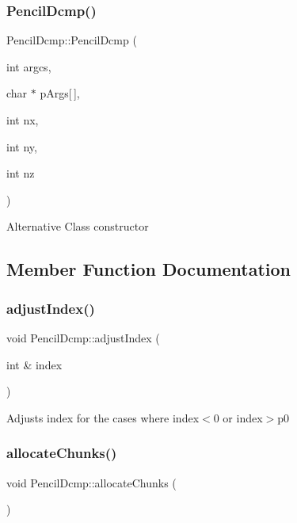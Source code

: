 \subsubsection{\texorpdfstring{Pencil\+Dcmp()}{PencilDcmp()}\hspace{0.1cm}{\footnotesize\ttfamily [2/2]}}
{\footnotesize\ttfamily Pencil\+Dcmp\+::\+Pencil\+Dcmp (\begin{DoxyParamCaption}\item[{int}]{argcs,  }\item[{char $\ast$}]{p\+Args\mbox{[}$\,$\mbox{]},  }\item[{int}]{nx,  }\item[{int}]{ny,  }\item[{int}]{nz }\end{DoxyParamCaption})}

Alternative Class constructor 

\subsection{Member Function Documentation}
\mbox{\label{classPencilDcmp_a653d1f3fec551d03a03ba9fdaf88ff96}} 
\subsubsection{\texorpdfstring{adjust\+Index()}{adjustIndex()}}
{\footnotesize\ttfamily void Pencil\+Dcmp\+::adjust\+Index (\begin{DoxyParamCaption}\item[{int \&}]{index }\end{DoxyParamCaption})\hspace{0.3cm}{\ttfamily [inline]}}

Adjusts index for the cases where index$<$0 or  index$>$p0 \mbox{\label{classPencilDcmp_ade8a6cbeeb92600a30403e74377689c6}} 
\subsubsection{\texorpdfstring{allocate\+Chunks()}{allocateChunks()}}
{\footnotesize\ttfamily void Pencil\+Dcmp\+::allocate\+Chunks (\begin{DoxyParamCaption}{ }\end{DoxyParamCaption})}

